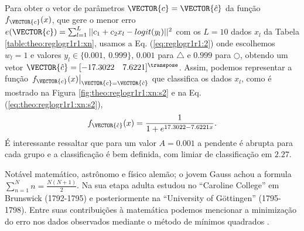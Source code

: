 \begin{SolutionT}\label{sol:theo:reglogr1r1:s2}
Para obter o vetor de parâmetros $\VECTOR{c}=\VECTOR{\hat{c}}$ da função $f_{\VECTOR{c}}(x)$, 
que gere o menor erro $e(\VECTOR{c}) =  \sum_{l=1}^{L} ||c_1 +c_2 x_l-logit(y_l)||^2$
com os $L=10$ dados $x_l$ da Tabela \ref{table:theo:reglogr1r1:xn},
usamos a Eq. (\ref{eq:reglogr1r1:2}) onde escolhemos $w_l=1$ e valores $y_l \in \{0.001,~ 0.999\}$,
$0.001$ para $\bigtriangleup$ e $0.999$ para $\bigcirc$,
obtendo um vetor $\VECTOR{\hat{c}}=[-17.3022\quad 7.6221]^{\transpose}$. 
Assim, podemos representar a função $\left.f_{\VECTOR{c}}(x)\right|_{\VECTOR{c}=\VECTOR{\hat{c}}}$ que classifica os dados $x_l$, 
como é mostrado na Figura \ref{fig:theo:reglogr1r1:xn:s2}  e na Eq. (\ref{eq:theo:reglogr1r1:xn:s2}),
\begin{equation}\label{eq:theo:reglogr1r1:xn:s2}
f_{\VECTOR{\hat{c}}}(x)= \frac{1}{1+e^{ 17.3022-7.6221 x}}.
\end{equation}
É interessante ressaltar que para um valor $A=0.001$ a pendente é abrupta para cada grupo e a classificação é bem definida,
com limiar de classificação em $2.27$.
\end{SolutionT}

\begin{elaboracion}[title=Karl Friedrich Gauss (1777-1855), width= 0.99\linewidth]
\label{elab:Gauss}
\noindent
Notável matemático, astrônomo e físico alemão;
o jovem Gauss achou a formula $\sum_{n=1}^{N}n=\frac{N(N+1)}{2}$.
Na sua etapa adulta estudou no ``Caroline College'' em Brunswick (1792-1795)
e posteriormente na ``University of G\"ottingen'' (1795-1798).
Entre suas contribuições à matemática podemos mencionar 
a minimização do erro nos dados observados
 mediante o método de mínimos quadrados \cite[pp. 225]{agarwal2014creators}.
\end{elaboracion}
